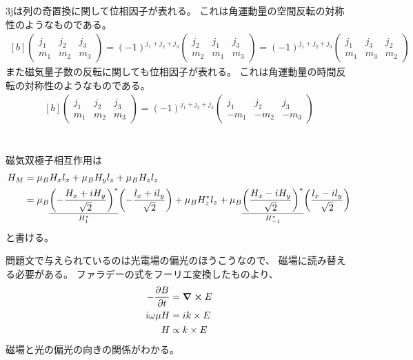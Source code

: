 \documentclass[../ap_2011.tex]{subfiles}
\begin{document}
3jは列の奇置換に関して位相因子が表れる。
これは角運動量の空間反転の対称性のようなものである。
\begin{equation}\begin{aligned}[b]
    \begin{pmatrix}
        j_1 & j_2 & j_3\\
        m_1 & m_2 & m_3
    \end{pmatrix}
    =(-1)^{j_1+j_2+j_3}\begin{pmatrix}
        j_2 & j_1 & j_3\\
        m_2 & m_1 & m_3
    \end{pmatrix}=(-1)^{j_1+j_2+j_3}\begin{pmatrix}
        j_1 & j_3 & j_2\\
        m_1 & m_3 & m_2
    \end{pmatrix}
\end{aligned}\end{equation}
また磁気量子数の反転に関しても位相因子が表れる。
これは角運動量の時間反転の対称性のようなものである。
\begin{equation}\begin{aligned}[b]
    \begin{pmatrix}
        j_1 & j_2 & j_3\\
        m_1 & m_2 & m_3
    \end{pmatrix}
    =(-1)^{j_1+j_2+j_3}\begin{pmatrix}
        j_1 & j_2 & j_3\\
        -m_1 & -m_2 & -m_3
    \end{pmatrix}
\end{aligned}\end{equation}

\section{}
磁気双極子相互作用は
\begin{equation}\begin{aligned}[b]
    H_M &= \mu_BH_xl_x + \mu_BH_yl_z+\mu_BH_zl_z\\
    &=\mu_B\underset{H_1^*}{\underline{\qty(-\frac{H_x+iH_y}{\sqrt{2}})^*}}\qty(-\frac{l_x+il_y}{\sqrt{2}})
    +\mu_BH_z^* l_z
    +\mu_B\underset{H_{-1}^*}{\underline{\qty(\frac{H_x-iH_y}{\sqrt{2}})^*}}\qty(\frac{l_x-il_y}{\sqrt{2}})
\end{aligned}\end{equation}
と書ける。

問題文で与えられているのは光電場の偏光のほうこうなので、
磁場に読み替える必要がある。
ファラデーの式をフーリエ変換したものより、
\begin{equation}\begin{aligned}[b]
    -\pdv{B}{t}&=\curl E\\
    i\omega \mu H &= ik\times E\\
    H &\propto k\times E
\end{aligned}\end{equation}
磁場と光の偏光の向きの関係がわかる。
\end{document}
